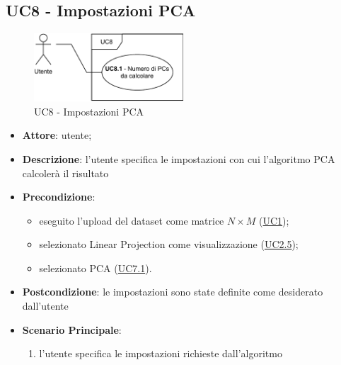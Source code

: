 \subsection{UC8 - Impostazioni PCA}
    \label{uc8}
    
    \begin{figure}[htbp]
        \centering
        \includegraphics[width=0.5\textwidth]{source/sections/casi-uso/diagrams/uc8.pdf}
        \caption{UC8 - Impostazioni PCA}
        \label{fig:uc8}
    \end{figure}
    
    \begin{itemize}
    \item \textbf{Attore}: utente;
    \item \textbf{Descrizione}: l'utente specifica le impostazioni con cui l'algoritmo PCA calcolerà il risultato
    \item \textbf{Precondizione}: 
    \begin{itemize}
        \item eseguito l'upload del dataset come matrice $N\times M$ (\hyperref[uc1]{UC1});
        \item selezionato Linear Projection come visualizzazione (\hyperref[uc2.5]{UC2.5});
        \item selezionato PCA (\hyperref[uc7.1]{UC7.1}).
    \end{itemize}  
    \item \textbf{Postcondizione}: le impostazioni sono state definite come desiderato dall'utente
    \item \textbf{Scenario Principale}: 
    \begin{enumerate}
        \item l'utente specifica le impostazioni richieste dall'algoritmo
    \end{enumerate}  
    \end{itemize}
    
    
